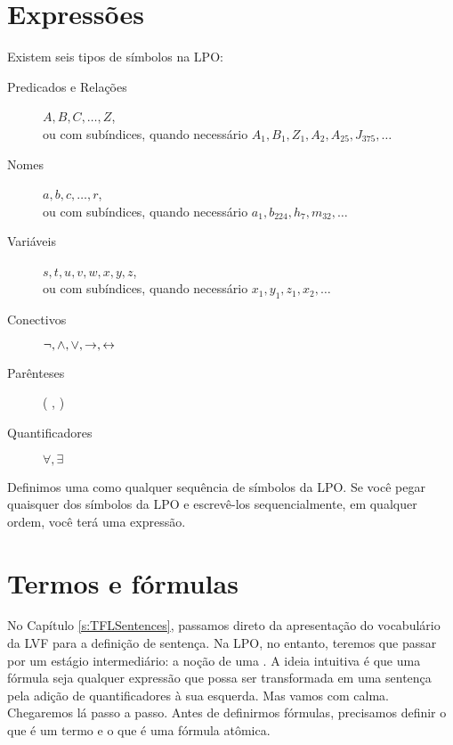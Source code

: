\section{Expressões}
Existem seis tipos de símbolos na LPO:

\begin{description}
\item[Predicados e Relações] $A,B,C,\ldots,Z$,\\ 
	ou com subíndices, quando necessário $A_1, B_1,Z_1,A_2,A_{25},J_{375},\ldots$
\item[Nomes] $a,b,c,\ldots, r$,\\
	ou com subíndices, quando necessário $a_1, b_{224}, h_7, m_{32},\ldots$
\item[Variáveis] $s, t, u, v, w, x,y,z$,\\
	ou com subíndices, quando necessário $x_1, y_1, z_1, x_2,\ldots$
\item[Conectivos]  $\neg,\wedge,\vee,\rightarrow,\leftrightarrow$
\item[Parênteses] ( , )
\item[Quantificadores]  $\forall, \exists$
\end{description}
Definimos uma  como qualquer sequência de símbolos da LPO.
Se você pegar quaisquer dos símbolos da LPO e escrevê-los sequencialmente, em qualquer ordem, você terá uma expressão.


\section{Termos e fórmulas}
\label{s:TermsFormulas}

No Capítulo \ref{s:TFLSentences}, passamos direto da apresentação do vocabulário da LVF para a definição de sentença.
Na LPO, no entanto, teremos que passar por um estágio intermediário: a noção de uma .
A ideia intuitiva é que uma fórmula seja qualquer expressão que possa ser transformada em uma sentença pela adição de quantificadores à sua esquerda.
Mas vamos com calma.
Chegaremos lá passo a passo.
Antes de definirmos fórmulas, precisamos  definir o que é um termo e o que é uma fórmula atômica.

